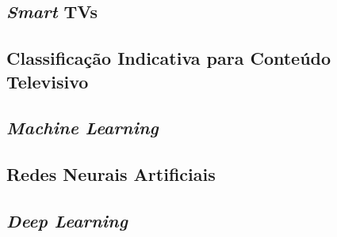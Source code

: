 
\subsection{\emph{Smart} TVs}


\subsection{Classificação Indicativa para Conteúdo Televisivo}


\subsection{\emph{Machine Learning}}


\subsection{Redes Neurais Artificiais}


\subsection{\emph{Deep Learning}}\label{sec:dl}

